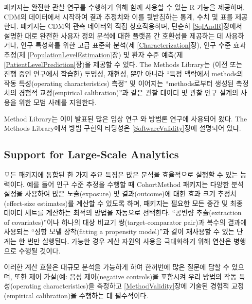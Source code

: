 \documentclass[11pt]{book}
\theoremstyle{definition}
\theoremstyle{definition}
\theoremstyle{definition}
\theoremstyle{remark}
\begin{document}
패키지는 완전한 관찰 연구를 수행하기 위해 함께 사용할 수 있는 R 기능을
제공하며, CDM의 데이터에서 시작하여 결과 추정치와 이를 뒷받침하는 통계,
수치 및 표를 제공한다. 패키지는 CDM의 관측 데이터와 직접 상호작용하며,
단순히 \ref{SqlAndR}장에서 설명한 대로 완전한 사용자 정의 분석에 대한
플랫폼 간 호환성을 제공하는 데 사용하거나, 인구 특성화를 위한 고급
표준화 분석(제 \ref{Characterization}장), 인구 수준 효과 추정(제
\ref{PopulationLevelEstimation}장) 및 환자 수준 예측(제
\ref{PatientLevelPrediction}장)을 제공할 수 있다. The Methods Library는
(이전 또는 진행 중인 연구에서 학습한) 투명성, 재현성, 뿐만 아니라 ``특정
맥락에서 methods의 작동 특성(operating characteristics) 측정'' 및
이어지는 ``methods로부터 생성된 측정치의 경험적 교정(empirical
calibration)''과 같은 관찰 데이터 및 관찰 연구 설계의 사용을 위한 모범
사례를 지원한다.

Method Library는 이미 발표된 많은 임상 연구
\citep{boland_2017, duke_2017, ramcharran_2017, weinstein_2017, wang_2017, ryan_2017, ryan_2018, vashisht_2018, yuan_2018, johnston_2019}와
방법론 연구에 사용되어 왔다.
\citep{schuemie_2014, schuemie_2016, reps2018, tian_2018, schuemie_2018, schuemie_2018b, reps_2019}
The Methods Library에서 방법 구현의 타당성은 \ref{SoftwareValidity}장에
설명되어 있다.

\subsection{Support for Large-Scale
Analytics}\label{support-for-large-scale-analytics}

모든 패키지에 통합된 한 가지 주요 특징은 많은 분석을 효율적으로 실행할
수 있는 능력이다. 예를 들어 인구 수준 추정을 수행할 때 CohortMethod
패키지는 다양한 분석 설정을 사용하여 많은 노출(exposure) 및
결과(outcome)에 대한 효과 크기 추정치(effect-size estimates)를 계산할 수
있도록 하며, 패키지는 필요한 모든 중간 및 최종 데이터 세트를 계산하는
최적의 방법을 자동으로 선택한다. ``공변량 추출(extraction of
covariates)''이나 하나의 대상 비교기 쌍(target-comparator pair)과 복수의
결과에 사용되는 ``성향 모델 장착(fitting a propensity model)''과 같이
재사용할 수 있는 단계는 한 번만 실행된다. 가능한 경우 계산 자원의 사용을
극대화하기 위해 연산은 병행으로 수행될 것이다.

이러한 계산 효율은 대규모 분석을 가능하게 하여 한꺼번에 많은 질문에 답할
수 있으며, 또한 제어 가설(예: 음성 제어(negative controls)을 포함시켜
우리 방법의 작동 특성(operating characteristics)을 측정하고
\ref{MethodValidity}장에 기술된 경험적 교정(empirical calibration)을
수행하는 데 필수적이다. 
\end{document}
